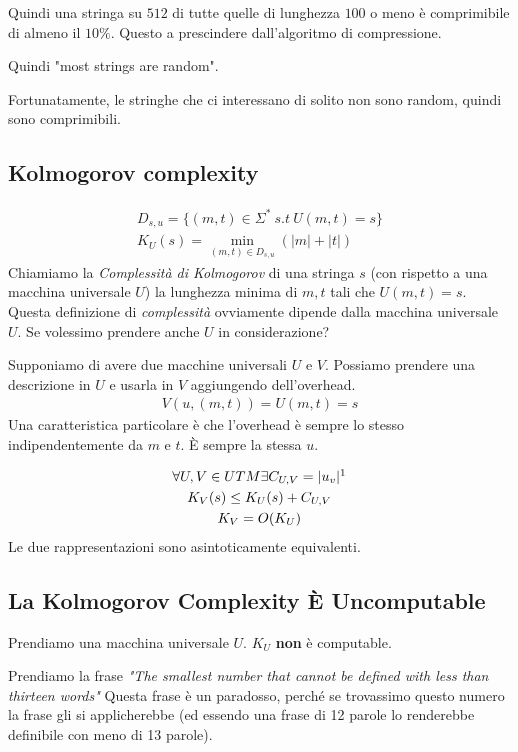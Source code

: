 \documentclass{article}
\begin{document}
Quindi una stringa su $512$ di tutte quelle di lunghezza $100$ o meno è comprimibile di almeno il $10\%$. Questo a prescindere dall'algoritmo di compressione.

Quindi "most strings are random".

Fortunatamente, le stringhe che ci interessano di solito non sono random, quindi sono comprimibili.

\subsection{Kolmogorov complexity}
\begin{gather*}
    D_{s,u} = \{(m,t)\in\Sigma^*\ s.t\ U(m,t)=s\} \\
    K_U(s) = \min_{(m,t)\in D_{s,u}}(|m|+|t|)
\end{gather*}
Chiamiamo la \textit{Complessità di Kolmogorov} di una stringa $s$ (con rispetto a una macchina universale $U$) la lunghezza minima di $m,t$ tali che $U(m,t)=s$. \\
Questa definizione di \textit{complessità} ovviamente dipende dalla macchina universale $U$. Se volessimo prendere anche $U$ in considerazione?

Supponiamo di avere due macchine universali $U$ e $V$. Possiamo prendere una descrizione in $U$ e usarla in $V$ aggiungendo dell'overhead.
\begin{gather*}
    V(u, (m,t)) = U(m,t) = s
\end{gather*}
Una caratteristica particolare è che l'overhead è sempre lo stesso indipendentemente da $m$ e $t$. È sempre la stessa $u$.

\begin{gather*}
    \forall U,V\in UTM \exists C_{U,V} = |u_v|\footnotemark\\
    K_V(s) \leq K_U(s) + C_{U,V} \\
    K_V = O(K_U) 
\end{gather*}
Le due rappresentazioni sono asintoticamente equivalenti. 

\subsection{La Kolmogorov Complexity È Uncomputable}
Prendiamo una macchina universale $U$. $K_U$ \textbf{non} è computable.

Prendiamo la frase \center
\textit{"The smallest number that cannot be defined with less than thirteen words"}
\flushleft
Questa frase è un paradosso, perché se trovassimo questo numero la frase gli si applicherebbe (ed essendo una frase di 12 parole lo renderebbe definibile con meno di 13 parole).
\end{document}
